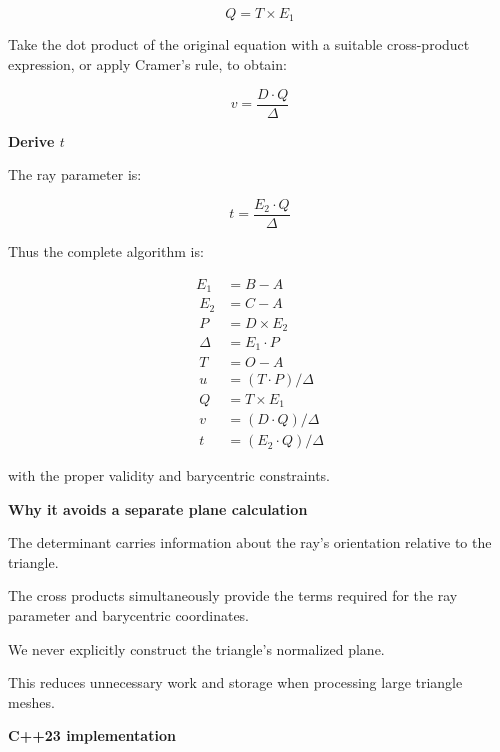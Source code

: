 \[
\boxed{ Q=T\times E_1 }
\]

Take the dot product of the original equation with a suitable cross-product expression, or apply Cramer's rule, to obtain:

\[
\boxed{ v=\frac{D\cdot Q}{\Delta} }
\]

\textbf{Derive \(t\)}

The ray parameter is:

\[
\boxed{ t=\frac{E_2\cdot Q}{\Delta} }
\]

Thus the complete algorithm is:

\[
\begin{aligned} E_1&=B-A\\\ E_2&=C-A\\\ P&=D\times E_2\\\ \Delta&=E_1\cdot P\\\ T&=O-A\\\ u&=(T\cdot P)/\Delta\\\ Q&=T\times E_1\\\ v&=(D\cdot Q)/\Delta\\\ t&=(E_2\cdot Q)/\Delta \end{aligned}
\]

with the proper validity and barycentric constraints.

\textbf{Why it avoids a separate plane calculation}

The determinant carries information about the ray's orientation relative to the triangle.

The cross products simultaneously provide the terms required for the ray parameter and barycentric coordinates.

We never explicitly construct the triangle's normalized plane.

This reduces unnecessary work and storage when processing large triangle meshes.

\textbf{C++23 implementation}

